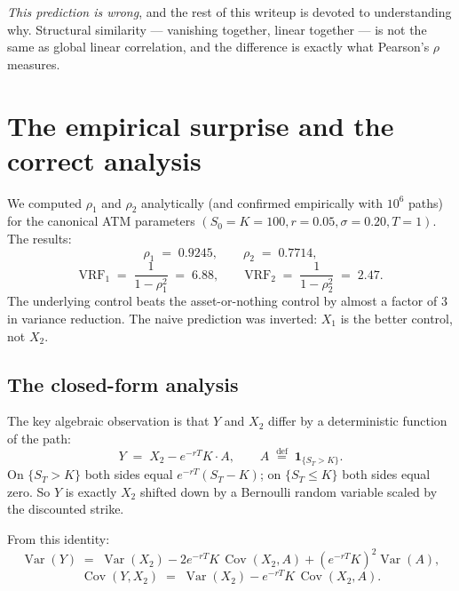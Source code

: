 \documentclass[11pt,a4paper]{article}
\theoremstyle{plain}
\theoremstyle{definition}
\theoremstyle{remark}
\newcommand{\Var}{\operatorname{Var}}
\newcommand{\Cov}{\operatorname{Cov}}
\newcommand{\eqdef}{\overset{\mathrm{def}}{=}}
\newcommand{\indic}{\mathbf{1}}
\begin{document}
\emph{This prediction is wrong}, and the rest of this writeup is
devoted to understanding why. Structural similarity --- vanishing
together, linear together --- is not the same as global linear
correlation, and the difference is exactly what Pearson's $\rho$
measures.

\section{The empirical surprise and the correct analysis}
\label{sec:correct}

We computed $\rho_1$ and $\rho_2$ analytically (and confirmed
empirically with $10^6$ paths) for the canonical ATM parameters
$(S_0 = K = 100, r = 0.05, \sigma = 0.20, T = 1)$. The results:
\begin{equation}
\rho_1 \;=\; 0.9245, \qquad \rho_2 \;=\; 0.7714,
\end{equation}
\begin{equation}
\mathrm{VRF}_1 \;=\; \frac{1}{1 - \rho_1^2} \;=\; 6.88,
\qquad
\mathrm{VRF}_2 \;=\; \frac{1}{1 - \rho_2^2} \;=\; 2.47.
\end{equation}
The underlying control beats the asset-or-nothing control by almost
a factor of $3$ in variance reduction. The naive prediction was
inverted: $X_1$ is the better control, not $X_2$.

\subsection{The closed-form analysis}

The key algebraic observation is that $Y$ and $X_2$ differ by a
deterministic function of the path:
\begin{equation}
\label{eq:Y-X2}
Y \;=\; X_2 - e^{-rT} K \cdot A,
\qquad A \;\eqdef\; \indic_{\{S_T > K\}}.
\end{equation}
On $\{S_T > K\}$ both sides equal $e^{-rT}(S_T - K)$; on $\{S_T \leq
K\}$ both sides equal zero. So $Y$ is exactly $X_2$ shifted down by a
Bernoulli random variable scaled by the discounted strike.

From this identity:
\begin{equation}
\Var(Y) \;=\; \Var(X_2) - 2 e^{-rT} K \,\Cov(X_2, A) + (e^{-rT} K)^2
\Var(A),
\end{equation}
\begin{equation}
\Cov(Y, X_2) \;=\; \Var(X_2) - e^{-rT} K \,\Cov(X_2, A).
\end{equation}
\end{document}

